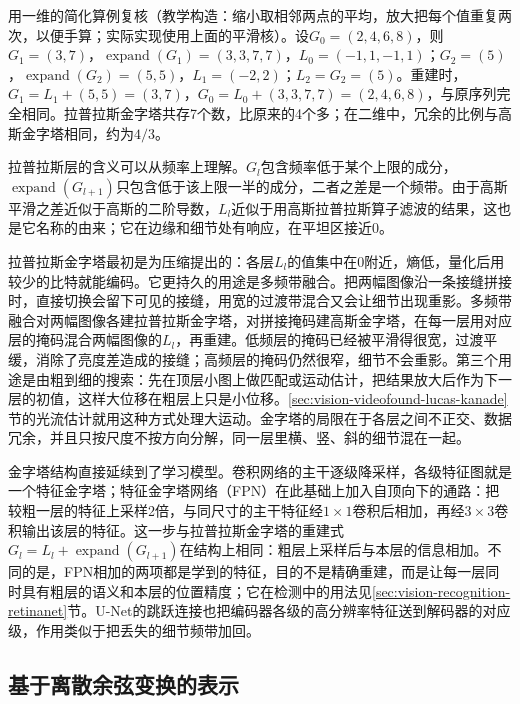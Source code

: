 用一维的简化算例复核（教学构造：缩小取相邻两点的平均，放大把每个值重复两次，以便手算；实际实现使用上面的平滑核）。设$G_0=(2,4,6,8)$，则$G_1=(3,7)$，$\operatorname{expand}(G_1)=(3,3,7,7)$，$L_0=(-1,1,-1,1)$；$G_2=(5)$，$\operatorname{expand}(G_2)=(5,5)$，$L_1=(-2,2)$；$L_2=G_2=(5)$。重建时，$G_1=L_1+(5,5)=(3,7)$，$G_0=L_0+(3,3,7,7)=(2,4,6,8)$，与原序列完全相同。拉普拉斯金字塔共存7个数，比原来的4个多；在二维中，冗余的比例与高斯金字塔相同，约为$4/3$。

拉普拉斯层的含义可以从频率上理解。$G_l$包含频率低于某个上限的成分，$\operatorname{expand}(G_{l+1})$只包含低于该上限一半的成分，二者之差是一个频带。由于高斯平滑之差近似于高斯的二阶导数，$L_l$近似于用高斯拉普拉斯算子滤波的结果，这也是它名称的由来；它在边缘和细节处有响应，在平坦区接近0。

拉普拉斯金字塔最初是为压缩提出的：各层$L_l$的值集中在0附近，熵低，量化后用较少的比特就能编码。它更持久的用途是多频带融合。把两幅图像沿一条接缝拼接时，直接切换会留下可见的接缝，用宽的过渡带混合又会让细节出现重影。多频带融合对两幅图像各建拉普拉斯金字塔，对拼接掩码建高斯金字塔，在每一层用对应层的掩码混合两幅图像的$L_l$，再重建。低频层的掩码已经被平滑得很宽，过渡平缓，消除了亮度差造成的接缝；高频层的掩码仍然很窄，细节不会重影。第三个用途是由粗到细的搜索：先在顶层小图上做匹配或运动估计，把结果放大后作为下一层的初值，这样大位移在粗层上只是小位移。\ref{sec:vision-videofound-lucas-kanade}节的光流估计就用这种方式处理大运动。金字塔的局限在于各层之间不正交、数据冗余，并且只按尺度不按方向分解，同一层里横、竖、斜的细节混在一起。

金字塔结构直接延续到了学习模型。卷积网络的主干逐级降采样，各级特征图就是一个特征金字塔；特征金字塔网络（FPN）在此基础上加入自顶向下的通路：把较粗一层的特征上采样2倍，与同尺寸的主干特征经$1\times1$卷积后相加，再经$3\times3$卷积输出该层的特征。这一步与拉普拉斯金字塔的重建式$G_l=L_l+\operatorname{expand}(G_{l+1})$在结构上相同：粗层上采样后与本层的信息相加。不同的是，FPN相加的两项都是学到的特征，目的不是精确重建，而是让每一层同时具有粗层的语义和本层的位置精度；它在检测中的用法见\ref{sec:vision-recognition-retinanet}节。U-Net的跳跃连接也把编码器各级的高分辨率特征送到解码器的对应级，作用类似于把丢失的细节频带加回。

\subsection{基于离散余弦变换的表示}
\label{sec:vision-transforms-dct}

